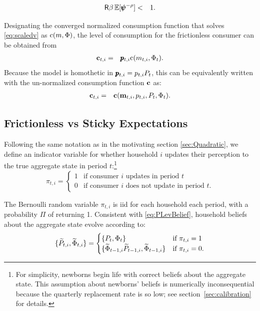 \documentclass[titlepage]{./econtex}
\begin{document}
\begin{eqnarray*}
  \label{eq:impatience}
  \mathsf{R} \beta  \operatorname{\mathbb{E}}[ \pmb{\psi}^{-\rho}]  & < & 1.
\end{eqnarray*}
 
Designating the converged normalized consumption function that solves \eqref{eq:scaledv} as
$\mathrm{c}(m,\Phi)$, the level of consumption for the frictionless consumer can be obtained from
\begin{eqnarray}
  \label{eq:cFlevel}
   \mathbf{c}_{t,i} & = & \pmb{p}_{t,i} \mathrm{c}(m_{t,i},\Phi_t)  \nonumber
.
\end{eqnarray}
 Because the model is homothetic in $\pmb{p}_{t,i}={p}_{t,i} {P}_{t}$, this can be equivalently written with the un-normalized consumption function $\textbf{c}$ as:
\begin{eqnarray*}
\mathbf{c}_{t,i} & = & \textbf{c}(\mathbf{m}_{t,i}, p_{t,i}, {P}_t, {\Phi}_t).
\end{eqnarray*}


\subsection{Frictionless vs Sticky Expectations}\label{sec:StickySOE}

Following the same notation as in the motivating section \ref{sec:Quadratic}, we define an indicator variable for whether household $i$ updates their perception to the true aggregate state in period $t$:\footnote{For simplicity, newborns begin life with correct beliefs about the aggregate state.  This assumption about newborns' beliefs is numerically inconsequential because the quarterly replacement rate is so low; see section~\ref{sec:calibration} for details.}
\begin{equation*}
\pi_{t,i} =
\begin{cases}
   1 & \text{if consumer $i$ updates in period $t$}
\\ 0 & \text{if consumer $i$ does not update in period $t$}.
\end{cases}
\end{equation*}

The Bernoulli random variable $\pi_{t,i}$ is iid for each household each period, with a probability $\Pi$ of returning 1.  Consistent with \eqref{eq:PLevBelief}, household beliefs about the aggregate state evolve according to:
\begin{equation}\label{eq:PLevBeliefSOE}
\{\widetilde{P}_{t,i},\widetilde{\Phi}_{t,i}\} = \begin{cases}
\{P_t, \Phi_t\} & \text{if } \pi_{t,i} = 1 \\
\{\widetilde{\Phi}_{t-1,i} \widetilde{P}_{t-1,i} , \widetilde{\Phi}_{t-1,i} \} & \text{if } \pi_{t,i} = 0.
\end{cases}
\end{equation}
\end{document}

